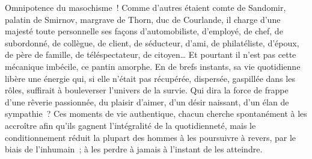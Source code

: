 \documentclass[french,twoside]{book} %
\newcommand{\astermono}{\medskip\centerline{\color{rubric}\large\selectfont{\syms ✻}}\medskip\par}%
\begin{document}
Omnipotence du masochisme ! Comme d’autres étaient comte de Sandomir, palatin de Smirnov, margrave de Thorn, duc de Courlande, il charge d’une majesté toute personnelle ses façons d’automobiliste, d’employé, de chef, de subordonné, de collègue, de client, de séducteur, d’ami, de philatéliste, d’époux, de père de famille, de téléspectateur, de citoyen… Et pourtant il n’est pas cette mécanique imbécile, ce pantin amorphe. En de brefs instants, sa vie quotidienne libère une énergie qui, si elle n’était pas récupérée, dispersée, gaspillée dans les rôles, suffirait à bouleverser l’univers de la survie. Qui dira la force de frappe d’une rêverie passionnée, du plaisir d’aimer, d’un désir naissant, d’un élan de sympathie ? Ces moments de vie authentique, chacun cherche spontanément à les accroître afin qu’ils gagnent l’intégralité de la quotidienneté, mais le conditionnement réduit la plupart des hommes à les poursuivre à revers, par le biais de l’inhumain ; à les perdre à jamais à l’instant de les atteindre.\par

\astermono
\end{document}
